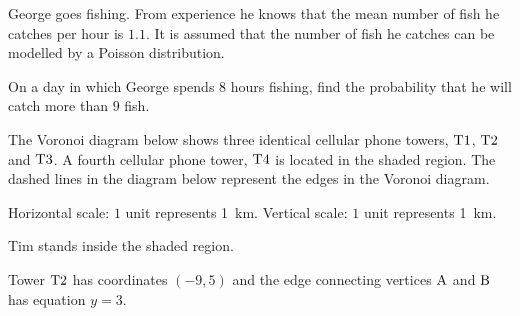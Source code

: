 \documentclass{src/ib}
\begin{document}
\begin{questions}
\question George goes fishing. From experience he knows that the mean number of fish he catches per hour is $1.1$. It is assumed that the number of fish he catches can be modelled by a Poisson distribution. 

On a day in which George spends $8$ hours fishing, find the probability that he will catch more than $9$ fish. 

\makeanswerbox
\newpage%

\question The Voronoi diagram below shows three identical cellular phone towers, $\mathrm T1$, $\mathrm T2$ and $\mathrm T3$. A fourth cellular phone tower, $\mathrm T4$ is located in the shaded region. The dashed lines in the diagram below represent the edges in the Voronoi diagram.

Horizontal scale: $1$ unit represents \SI{1}{\km}. \linebreak
Vertical scale: $1$ unit represents \SI{1}{\km}.

Tim stands inside the shaded region. 
Tower $\mathrm T2$ has coordinates $(-9 , 5)$ and the edge connecting vertices $\mathrm A$ and $\mathrm B$ has equation $y = 3$.
\begin{parts}

\end{parts}
\end{questions}
\end{document}
